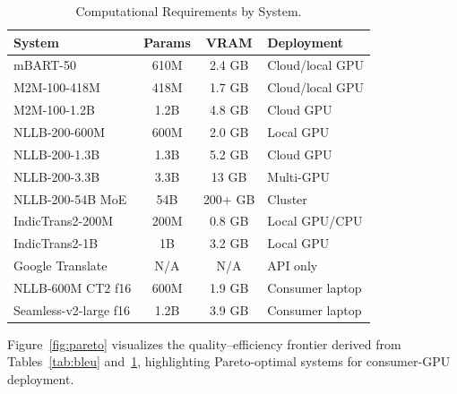 \documentclass[conference]{IEEEtran}
\begin{document}
\begin{table}[t]
  \centering
  \caption{Computational Requirements by System.}
  \label{tab:compute}
  \small
  \setlength{\tabcolsep}{3pt}
  \begin{tabular}{p{3.0cm} c c p{1.8cm}}
    \toprule
    \textbf{System} & \textbf{Params} & \textbf{VRAM} & \textbf{Deployment} \\
    \midrule
    mBART-50         & 610M  & 2.4 GB & Cloud/local GPU \\
    M2M-100-418M     & 418M  & 1.7 GB & Cloud/local GPU \\
    M2M-100-1.2B     & 1.2B  & 4.8 GB & Cloud GPU       \\
    NLLB-200-600M    & 600M  & 2.0 GB & Local GPU       \\
    NLLB-200-1.3B    & 1.3B  & 5.2 GB & Cloud GPU       \\
    NLLB-200-3.3B    & 3.3B  & 13 GB  & Multi-GPU       \\
    NLLB-200-54B MoE & 54B   & 200+ GB& Cluster         \\
    IndicTrans2-200M & 200M  & 0.8 GB & Local GPU/CPU   \\
    IndicTrans2-1B   & 1B    & 3.2 GB & Local GPU       \\
    Google Translate & N/A   & N/A    & API only        \\
    NLLB-600M CT2 f16& 600M  & 1.9 GB & Consumer laptop \\
    Seamless-v2-large f16 & 1.2B & 3.9 GB & Consumer laptop \\
    \bottomrule
  \end{tabular}
\end{table}

Figure~\ref{fig:pareto} visualizes the quality--efficiency frontier derived
from Tables~\ref{tab:bleu} and~\ref{tab:compute}, highlighting Pareto-optimal
systems for consumer-GPU deployment.
\end{document}
